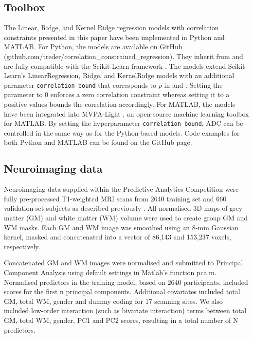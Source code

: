 \documentclass[utf8]{frontiersSCNS} %
\begin{document}
\subsection{Toolbox}\label{sec:toolbox}

The Linear, Ridge, and Kernel Ridge regression models with correlation constraints presented in this paper have been implemented in Python and MATLAB. For Python, the models are available on GitHub (github.com/treder/correlation\_constrained\_regression). They inherit from and are fully compatible with the Scikit-Learn framework \citep{Pedregosa2011Scikit-learn:Python}. The models extend Scikit-Learn's LinearRegression, Ridge, and KernelRidge models with an additional parameter \verb|correlation_bound| that corresponds to $\rho$ in  and . Setting the parameter to 0 enforces a zero correlation constraint whereas setting it to a positive values bounds the correlation accordingly. For MATLAB, the models have been integrated into MVPA-Light  \citep{Treder2020MVPA-Light:Data}, an open-source machine learning toolbox for MATLAB. By setting the hyperparameter \verb|correlation_bound|, ADC can be controlled in the same way as for the Python-based models. Code examples for both Python and MATLAB can  be found on the GitHub page. 


\subsection{Neuroimaging data}\label{sec:neuroimaging}
Neuroimaging data supplied within the Predictive Analytics Competition were fully pre-processed T1-weighted MRI scans from 2640 training set and 660 validation set subjects as described previously \citep{Cole2017PredictingBiomarker}. All normalised 3D maps of grey matter (GM) and white matter (WM) volume were used to create group GM and WM masks. Each GM and WM image was smoothed using an 8-mm Gaussian kernel, masked and concatenated into a vector of 86,143 and 153,237 voxels, respectively. 

Concatenated GM and WM images were normalised and submitted to Principal Component Analysis using default settings in Matlab’s function pca.m. Normalised predictors in the training model, based on 2640 participants, included scores for the first n principal components. Additional covariates included total GM, total WM, gender and dummy coding for 17 scanning sites. We also included low-order interaction (such as bivariate interaction) terms between total GM, total WM, gender, PC1 and PC2 scores, resulting in a total number of N predictors.
\end{document}
